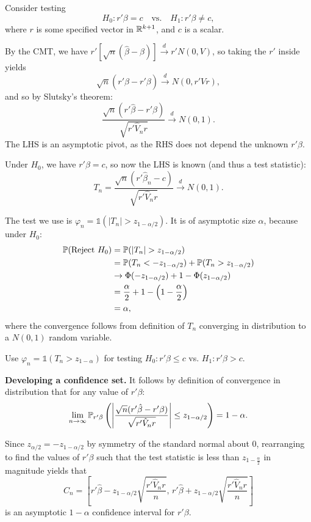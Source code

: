 \begin{proposition}
	Consider testing \[
		H_0: r' \beta = c \quad \text{vs.} \quad H_1: r' \beta \ne c
	,\] where $r$ is some specified vector in $\R^{k+1}$, and $c$ is a scalar.
	
	By the CMT, we have $r' \left[ \sqrt{n} \left( \hat{\beta}- \beta \right) \right] \xrightarrow{d} r' N(0,V)$, so taking the $r'$ inside yields \[
		\sqrt{n}(r' \hat{\beta} - r' \beta) \xrightarrow{d} N(0, r' V r)
	,\] and so by Slutsky's theorem: \[
		\frac{\sqrt{n}(r' \hat{\beta} - r' \beta)}{\sqrt{r' \hat{V}_n r}} \xrightarrow{d} N(0,1)
	.\] The LHS is an asymptotic pivot, as the RHS does not depend the unknown $r' \beta$.
	
	Under $H_0$, we have $r'\beta = c$, so now the LHS is known (and thus a test statistic): \[
		T_n = \frac{\sqrt{n}(r' \hat{\beta}_n - c)}{\sqrt{r' \hat{V}_n r}} \xrightarrow{d} N(0,1)
	.\] 
	
	The test we use is $\varphi_n = \mathds{1}(|T_n| > z_{1-\alpha/2})$. It is of asymptotic size $\alpha$, because under $H_0$: \begin{align*}
		\P(\text{Reject } H_0) &= \P(|T_n| > z_{1-\alpha/2}) \\
		&= \P(T_n < -z_{1-\alpha/2}) + \P(T_n > z_{1-\alpha/2}) \\
		&\to \Phi(-z_{1-\alpha/2}) + 1 - \Phi(z_{1-\alpha/2}) \\
		&= \frac{\alpha}{2} + 1 - \left(1 - \frac{\alpha}{2}\right) \\
		&= \alpha
	,\end{align*}
	where the convergence follows from definition of $T_n$ converging in distribution to a $N(0,1)$ random variable.
	
	Use $\varphi_n = \mathds{1}(T_n > z_{1-\alpha})$ for testing $H_0: r' \beta \le c$ vs. $H_1: r' \beta > c$.

	\textbf{Developing a confidence set. }
	It follows by definition of convergence in distribution that for any value of $r' \beta$: \[
		\lim_{n \to \infty} \P_{r' \beta} \left( \left| \frac{\sqrt{n}(r' \hat{\beta} - r' \beta)}{\sqrt{r' \hat{V}_n r}} \right| \le z_{1-\alpha/2} \right) = 1 - \alpha
	.\] 
	
	Since $z_{\alpha/2} = -z_{1-\alpha/2}$ by symmetry of the standard normal about $0$, rearranging to find the values of $r'\beta$ such that the test statistic is less than $z_{1-\frac{\alpha}{2}}$ in magnitude yields that \[
		C_n = \left[ r' \hat{\beta} - z_{1-\alpha/2} \sqrt{\frac{r' \hat{V}_n r}{n}}, \, r' \hat{\beta} + z_{1-\alpha/2} \sqrt{\frac{r' \hat{V}_n r}{n}} \right]
	\] is an asymptotic $1 - \alpha$ confidence interval for $r' \beta$.
\end{proposition}


